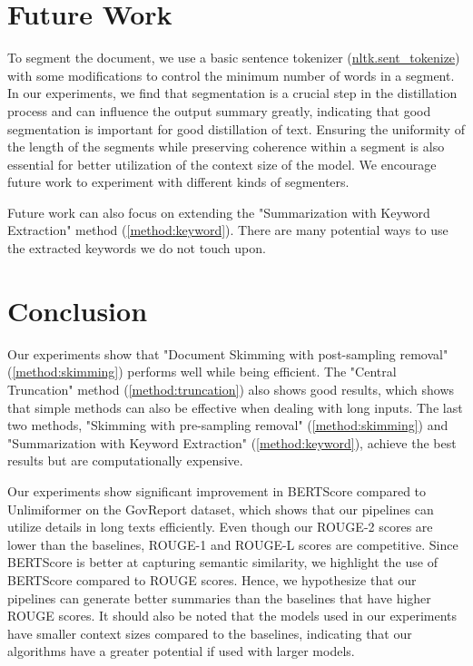 \section{Future Work}
\label{sec:future-work}

To segment the document, we use a basic sentence tokenizer (\href{https://www.nltk.org/api/nltk.tokenize.sent_tokenize.html}{nltk.sent\_tokenize}) with some modifications to control the minimum number of words in a segment.
In our experiments, we find that segmentation is a crucial step in the distillation process and can influence the output summary greatly, indicating that good segmentation is important for good distillation of text.
Ensuring the uniformity of the length of the segments while preserving coherence within a segment is also essential for better utilization of the context size of the model.
We encourage future work to experiment with different kinds of segmenters.

Future work can also focus on extending the "Summarization with Keyword Extraction" method (\autoref{method:keyword}).
There are many potential ways to use the extracted keywords we do not touch upon.


\section{Conclusion}
\label{sec:conclusion}

Our experiments show that "Document Skimming with post-sampling removal" (\autoref{method:skimming}) performs well while being efficient.
The "Central Truncation" method (\autoref{method:truncation}) also shows good results, which shows that simple methods can also be effective when dealing with long inputs.
The last two methods, "Skimming with pre-sampling removal" (\autoref{method:skimming}) and "Summarization with Keyword Extraction" (\autoref{method:keyword}), achieve the best results but are computationally expensive.

Our experiments show significant improvement in BERTScore compared to Unlimiformer \cite{bertsch2023unlimiformer} on the GovReport dataset, which shows that our pipelines can utilize details in long texts efficiently.
Even though our ROUGE-2 scores are lower than the baselines, ROUGE-1 and ROUGE-L scores are competitive.
Since BERTScore is better at capturing semantic similarity, we highlight the use of BERTScore compared to ROUGE scores.
Hence, we hypothesize that our pipelines can generate better summaries than the baselines that have higher ROUGE scores.
It should also be noted that the models used in our experiments have smaller context sizes compared to the baselines, indicating that our algorithms have a greater potential if used with larger models.


